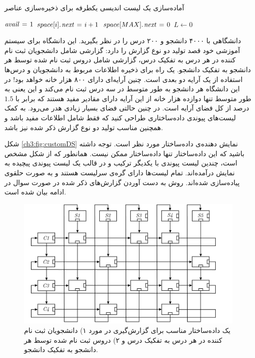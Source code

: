 \begin{algorithm}
\caption{آماده‌سازی یک لیست اندیسی یکطرفه برای ذخیره‌سازی عناصر}\label{ch3:alg:initIdxLst}
\begin{latin}
\begin{algorithmic}[1]
    \State    $\mathit{avail} \mathrel{\hspace{1pt}=\hspace{1pt}} 1$
        \State    $space[i].\hspace*{1pt}\mathit{next} \mathrel{\hspace{1pt}=\hspace{1pt}} i + 1$
    \EndFor
    \State    $space[MAX].\hspace*{1pt}\mathit{next} \mathrel{\hspace{1pt}=\hspace{1pt}} 0$
    \State    $L \gets 0$
\EndProcedure
\end{algorithmic}
\end{latin}
\end{algorithm}

 دانشگاهی با ۴۰۰۰ دانشجو و ۲۰۰ درس را در نظر بگیرید. این دانشگاه برای سیستم آموزشی خود قصد تولید دو نوع گزارش را دارد:
 گزارشی شامل دانشجویان ثبت نام کننده در هر درس به تفکیک درس،
 گزارشی شامل دروس ثبت نام شده توسط هر دانشجو به تفکیک دانشجو.
یک راه برای ذخیره اطلاعات مربوط به دانشجویان و درس‌ها استفاده از یک آرایه دو بعدی است. چنین آرایه‌ای دارای ۸۰۰ هزار خانه خواهد بود! در این دانشگاه هر دانشجو به طور متوسط در سه درس ثبت نام می‌کند و این یعنی به طور متوسط تنها دوازده هزار خانه از این آرایه دارای مقادیر مفید هستند که برابر با {$1.5$} درصد از کل فضای آرایه است. در چنین حالتی فضای بسیار زیادی هدر می‌رود. به کمک لیست‌های پیوندی داده‌ساختاری طراحی کنید که فقط شامل اطلاعات مفید باشد و همچنین مناسب تولید دو نوع گزارش ذکر شده نیز باشد.


شکل {\eqref{ch3:fig:customDS}} نمایش دهنده‌ی داده‌ساختار مورد نظر است. توجه داشته باشید که این داده‌ساختار تنها داده‌ساختار ممکن نیست. همانطور که از شکل مشخص است، چندین لیست پیوندی با یکدیگر ترکیب و در قالب یک لیست پیوندی پیچیده به نمایش درآمده‌اند. تمام لیست‌ها دارای گره‌ی سرلیست هستند و به صورت حلقوی پیاده‌سازی شده‌اند. روش به دست آوردن گزارش‌های ذکر شده در صورت سوال در ادامه بیان شده است.

\begin{figure}
\begin{center}
\includegraphics[scale=0.33]{figs/ch3/custom_ds.pdf}
\caption{%
یک داده‌ساختار مناسب برای گزارش‌گیری در مورد ۱) دانشجویان ثبت نام کننده در هر درس به تفکیک درس و ۲) دروس ثبت نام شده توسط هر دانشجو به تفکیک دانشجو.
}\label{ch3:fig:customDS}
\end{center}
\end{figure}

